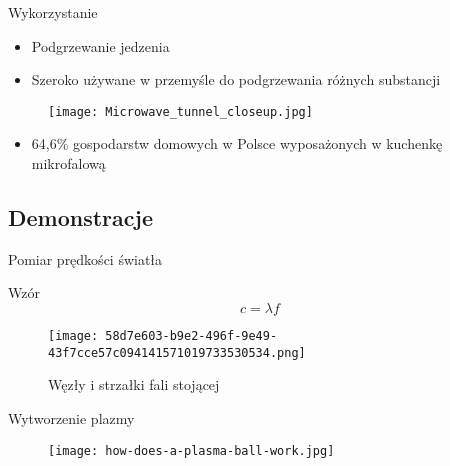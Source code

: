 \documentclass{beamer}
\begin{document}
\begin{frame}{Wykorzystanie}

\begin{itemize}
    \item Podgrzewanie jedzenia\pause
    \item Szeroko używane w przemyśle do podgrzewania różnych substancji
\end{itemize}

\begin{figure}
    \centering
    \texttt{[image: Microwave\_tunnel\_closeup.jpg]}
    \label{fig:my_label}
\end{figure}\pause

\begin{itemize}
    \item 64,6\% gospodarstw domowych w Polsce wyposażonych w kuchenkę mikrofalową
\end{itemize}
    
\end{frame}

\subsection{Demonstracje}


\begin{frame}{Pomiar prędkości światła}
    \begin{block}{Wzór}
    $$c=\lambda f$$
    \end{block}
\begin{figure}
    \centering
    \texttt{[image: 58d7e603-b9e2-496f-9e49-43f7cce57c094141571019733530534.png]}
    \caption{Węzły i strzałki fali stojącej}
    \label{wis}
\end{figure}
\end{frame}

\begin{frame}{Wytworzenie plazmy}

\begin{figure}
    \centering
    \texttt{[image:  how-does-a-plasma-ball-work.jpg]}
    \label{fig:my_plasma}
\end{figure}

\end{frame}
\end{document}
